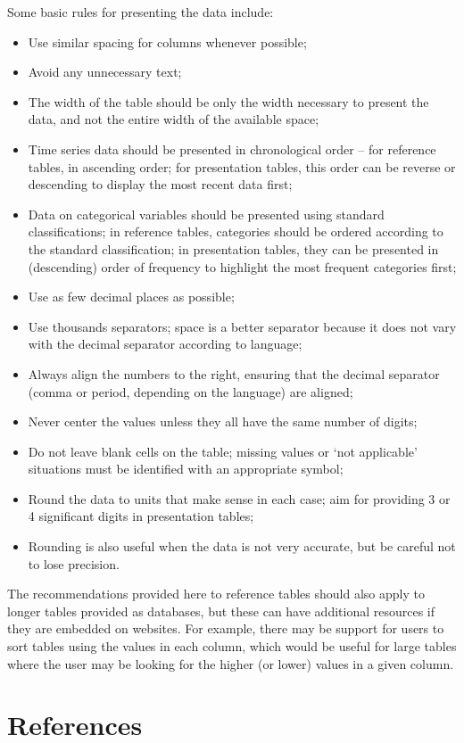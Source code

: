 \documentclass[
  12pt,
]{book}
\providecommand{\tightlist}{%
  \setlength{\itemsep}{0pt}\setlength{\parskip}{0pt}}
\begin{document}
Some basic rules for presenting the data include:

\begin{itemize}
\tightlist
\item
  Use similar spacing for columns whenever possible;
\item
  Avoid any unnecessary text;
\item
  The width of the table should be only the width necessary to present the data, and not the entire width of the available space;
\item
  Time series data should be presented in chronological order -- for reference tables, in ascending order; for presentation tables, this order can be reverse or descending to display the most recent data first;
\item
  Data on categorical variables should be presented using standard classifications; in reference tables, categories should be ordered according to the standard classification; in presentation tables, they can be presented in (descending) order of frequency to highlight the most frequent categories first;
\item
  Use as few decimal places as possible;
\item
  Use thousands separators; space is a better separator because it does not vary with the decimal separator according to language;
\item
  Always align the numbers to the right, ensuring that the decimal separator (comma or period, depending on the language) are aligned;
\item
  Never center the values unless they all have the same number of digits;
\item
  Do not leave blank cells on the table; missing values or `not applicable' situations must be identified with an appropriate symbol;
\item
  Round the data to units that make sense in each case; aim for providing 3 or 4 significant digits in presentation tables;
\item
  Rounding is also useful when the data is not very accurate, but be careful not to lose precision.
\end{itemize}

The recommendations provided here to reference tables should also apply to longer tables provided as databases, but these can have additional resources if they are embedded on websites. For example, there may be support for users to sort tables using the values in each column, which would be useful for large tables where the user may be looking for the higher (or lower) values in a given column.

\hypertarget{references}{%
\chapter*{References}\label{references}}

  
\end{document}
